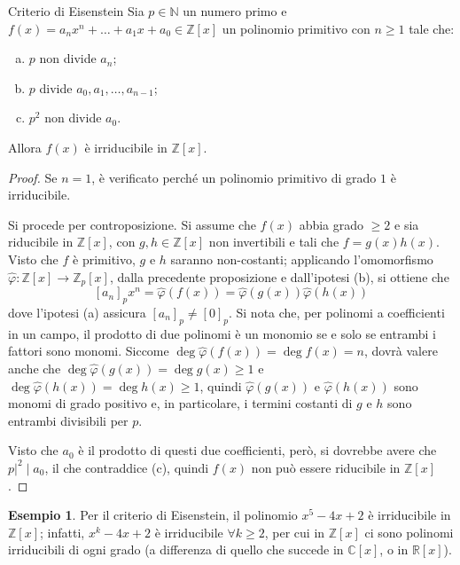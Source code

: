 \documentclass[11pt, a4paper]{scrartcl}
\theoremstyle{definition}
\newtheorem{esempio}{Esempio}
\numberwithin{esempio}{section}
\theoremstyle{definition}
\numberwithin{obs}{section}
\numberwithin{nota}{section}
\numberwithin{equation}{subsection}
\begin{document}
\begin{teorema}
	{Criterio di Eisenstein}{}
	Sia $p \in \mathbb{N}$ un numero primo e $f(x) = a_n x^n + \ldots + a_1 x + a_0 \in \mathbb{Z}[x]$ un polinomio primitivo con $n \ge  1$ tale che:
	\begin{enumerate}[(a).]
		\item $p$ non divide $a_n$;
		\item $p$ divide $a_0, a_1, \ldots, a_{n-1} $;
		\item $p^2$ non divide $a_0$.
	\end{enumerate}
	Allora $f(x)$ \`e irriducibile in $\mathbb{Z}[x]$.
	\begin{proof} 

		Se $n=1$, \`e verificato perch\'e un polinomio primitivo di grado $1$ \`e irriducibile.

		Si procede per controposizione.
		Si assume che $f(x)$ abbia grado $\ge 2$ e sia riducibile in $\mathbb{Z}[x]$, con $g,h \in \mathbb{Z}[x]$ non invertibili e tali che $f = g(x) h(x)$.
		Visto che $f$ \`e primitivo, $g$ e $h$ saranno non-costanti; applicando l'omomorfismo $\hat{\varphi }:\mathbb{Z}[x]\to \mathbb{Z}_p[x]$, dalla precedente proposizione e dall'ipotesi (b), si ottiene che
		\[
			[a_n]_px^n= \hat{\varphi }(f(x)) = \hat{\varphi }(g(x)) \hat{\varphi }(h(x))
		\] 
		dove l'ipotesi (a) assicura $[a_n]_p \neq [0]_p$.
		Si nota che, per polinomi a coefficienti in un campo, il prodotto di due polinomi \`e un monomio se e solo se entrambi i fattori sono monomi.
Siccome $\operatorname{deg} \hat{\varphi }(f(x)) = \operatorname{deg} f(x) = n$, dovr\`a valere anche che $\operatorname{deg} \hat{\varphi }(g(x)) = \operatorname{deg} g(x) \ge 1$ e $\operatorname{deg} \hat{\varphi }(h(x)) = \operatorname{deg} h(x) \ge 1$, quindi $\hat{\varphi }(g(x))$ e $\hat{\varphi }(h(x))$ sono monomi di grado positivo e, in particolare, i termini costanti di $g$ e $h$ sono entrambi divisibili per $p$.

Visto che $a_0$ \`e il prodotto di questi due coefficienti, per\`o, si dovrebbe avere che $p|^2  \mid a_0$, il che contraddice (c), quindi $f(x)$ non pu\`o essere riducibile in $\mathbb{Z}[x]$.
	\end{proof}
\end{teorema}
\begin{esempio}
	Per il criterio di Eisenstein, il polinomio $x^5 - 4x + 2 $ \`e irriducibile in $\mathbb{Z}[x]$; infatti, $x^k - 4x + 2 $ \`e irriducibile $\forall k\ge 2$, per cui in $\mathbb{Z}[x]$ ci sono polinomi irriducibili di ogni grado (a differenza di quello che succede in $\mathbb{C}[x]$, o in $\mathbb{R}[x]$).
\end{esempio}
\end{document}
